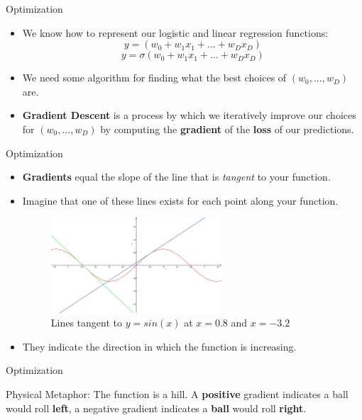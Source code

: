 \begin{frame}{Optimization}
\begin{itemize}
    \item We know how to represent our logistic and linear regression functions:
    $$y =(w_0 + w_1x_1 + ... + w_Dx_D)$$
    $$y = \sigma(w_0 + w_1x_1 + ... + w_Dx_D)$$
    \item We need some algorithm for finding what the best choices of $(w_0, ..., w_D)$ are.
    \item \textbf{Gradient Descent} is a process by which we iteratively improve our choices for $(w_0, ..., w_D)$ by computing the \textbf{gradient} of the \textbf{loss} of our predictions.
\end{itemize}
\end{frame}

\begin{frame}{Optimization}
\begin{itemize}
    \item \textbf{Gradients} equal the slope of the line that is \textit{tangent} to your function.
    \item Imagine that one of these lines exists for each point along your function.
    \begin{figure}
    \centering
    \includegraphics[width=0.6\textwidth]{img/TwoTangentLine.jpg}
    \caption{Lines tangent to $y = sin(x)$ at $x = 0.8$ and $x=-3.2$}
    \end{figure}
    \item They indicate the direction in which the function is increasing.
    
\end{itemize}
\end{frame}

\begin{frame}{Optimization}
    \begin{center}
    \item Physical Metaphor: The function is a hill. A \textbf{positive} gradient indicates a ball would roll \textbf{left}, a negative gradient indicates a \textbf{ball} would roll \textbf{right}.
    \end{center}
\end{frame}

